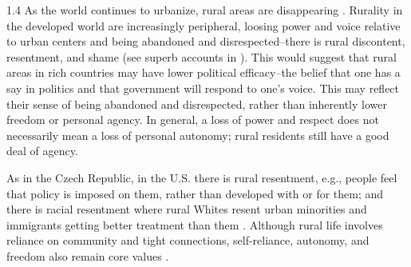 \documentclass[10pt, letterpaper]{article}
\begin{document}
\begin{spacing}{1.4}
As the world continues to urbanize, rural areas are disappearing 
 \citep{pospvech2024loss}. Rurality in the developed world are increasingly peripheral, loosing power and voice relative to urban centers and being abandoned and disrespected--there is rural discontent, resentment, and shame (see superb accounts in 
 \citet{hansonCityJournalautumn15,fullerNYT17monD}). This would suggest that rural areas in rich countries may have lower political efficacy--the belief that one has a say in politics and that government will respond to one's voice. This may reflect their sense of being abandoned and disrespected, rather than inherently lower freedom or personal agency. 
 In general, a loss of power and respect does not necessarily mean a loss of personal autonomy; rural residents still have a good deal of agency. 

 As in the Czech Republic, in the U.S. there is rural resentment, e.g., people feel that policy is imposed on them, rather than developed with or for them; and there is racial resentment where rural Whites resent urban minorities and immigrants getting better treatment than them \citep{diamond23}. %
 Although rural life involves reliance on community and tight connections, self-reliance, autonomy, and freedom also remain core values \citep{diamond23}.



\end{spacing}
\end{document}
